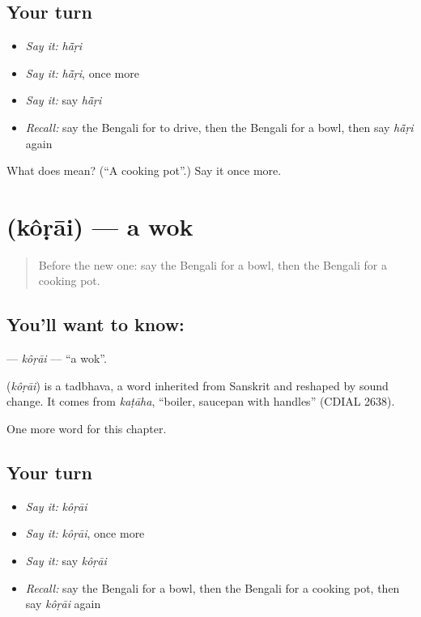 \subsection*{Your turn}
\begin{itemize}
\raggedright
  \item \emph{Say it:} \emph{hā̃ṛi}
  \item \emph{Say it:} \emph{hā̃ṛi}, once more
  \item \emph{Say it:} say \emph{hā̃ṛi}
  \item \emph{Recall:} say the Bengali for to drive, then the Bengali for a bowl, then say \emph{hā̃ṛi} again
\end{itemize}

\begin{tcolorbox}[breakable,colback=teal!4,colframe=teal!35!black,title={Before you move on}]
What does  mean? (\textquotedblleft{}A cooking pot\textquotedblright{}.) Say it once more.
\end{tcolorbox}
\section[\texorpdfstring{\bn{কড়াই} (kôṛāi)}{কড়াই (kôṛāi)}]{ (kôṛāi) — a wok}

\label{lesson:BN-C107-korai}



\begin{quote}
Before the new one: say the Bengali for a bowl, then the Bengali for a cooking pot.
\end{quote}

\subsection*{You'll want to know: }
\textbf{} — \emph{kôṛāi} — \textquotedblleft{}a wok\textquotedblright{}.

\begin{cousinweb}
\textbf{} (\emph{kôṛāi}) is a tadbhava, a word inherited from Sanskrit and reshaped by sound change. It comes from \emph{kaṭāha}, \textquotedblleft{}boiler, saucepan with handles\textquotedblright{} (CDIAL 2638).
\end{cousinweb}

\begin{grammarlens}[title={What you've built}]
One more word for this chapter.
\end{grammarlens}

\subsection*{Your turn}
\begin{itemize}
\raggedright
  \item \emph{Say it:} \emph{kôṛāi}
  \item \emph{Say it:} \emph{kôṛāi}, once more
  \item \emph{Say it:} say \emph{kôṛāi}
  \item \emph{Recall:} say the Bengali for a bowl, then the Bengali for a cooking pot, then say \emph{kôṛāi} again
\end{itemize}

